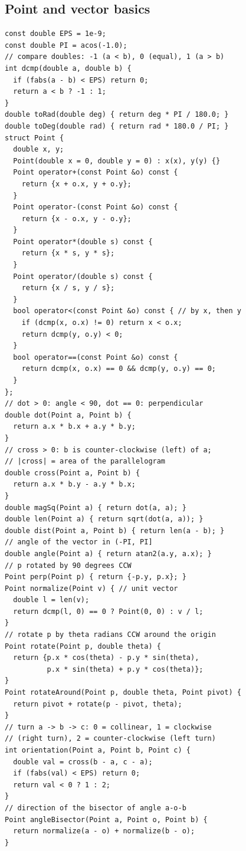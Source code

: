 \documentclass[8pt, a4paper]{article}
\begin{document}
\begin{multicols*}{3}
\subsection{Point and vector basics}
\begin{lstlisting}
const double EPS = 1e-9;
const double PI = acos(-1.0);
// compare doubles: -1 (a < b), 0 (equal), 1 (a > b)
int dcmp(double a, double b) {
  if (fabs(a - b) < EPS) return 0;
  return a < b ? -1 : 1;
}
double toRad(double deg) { return deg * PI / 180.0; }
double toDeg(double rad) { return rad * 180.0 / PI; }
struct Point {
  double x, y;
  Point(double x = 0, double y = 0) : x(x), y(y) {}
  Point operator+(const Point &o) const {
    return {x + o.x, y + o.y};
  }
  Point operator-(const Point &o) const {
    return {x - o.x, y - o.y};
  }
  Point operator*(double s) const {
    return {x * s, y * s};
  }
  Point operator/(double s) const {
    return {x / s, y / s};
  }
  bool operator<(const Point &o) const { // by x, then y
    if (dcmp(x, o.x) != 0) return x < o.x;
    return dcmp(y, o.y) < 0;
  }
  bool operator==(const Point &o) const {
    return dcmp(x, o.x) == 0 && dcmp(y, o.y) == 0;
  }
};
// dot > 0: angle < 90, dot == 0: perpendicular
double dot(Point a, Point b) {
  return a.x * b.x + a.y * b.y;
}
// cross > 0: b is counter-clockwise (left) of a;
// |cross| = area of the parallelogram
double cross(Point a, Point b) {
  return a.x * b.y - a.y * b.x;
}
double magSq(Point a) { return dot(a, a); }
double len(Point a) { return sqrt(dot(a, a)); }
double dist(Point a, Point b) { return len(a - b); }
// angle of the vector in (-PI, PI]
double angle(Point a) { return atan2(a.y, a.x); }
// p rotated by 90 degrees CCW
Point perp(Point p) { return {-p.y, p.x}; }
Point normalize(Point v) { // unit vector
  double l = len(v);
  return dcmp(l, 0) == 0 ? Point(0, 0) : v / l;
}
// rotate p by theta radians CCW around the origin
Point rotate(Point p, double theta) {
  return {p.x * cos(theta) - p.y * sin(theta),
          p.x * sin(theta) + p.y * cos(theta)};
}
Point rotateAround(Point p, double theta, Point pivot) {
  return pivot + rotate(p - pivot, theta);
}
// turn a -> b -> c: 0 = collinear, 1 = clockwise
// (right turn), 2 = counter-clockwise (left turn)
int orientation(Point a, Point b, Point c) {
  double val = cross(b - a, c - a);
  if (fabs(val) < EPS) return 0;
  return val < 0 ? 1 : 2;
}
// direction of the bisector of angle a-o-b
Point angleBisector(Point a, Point o, Point b) {
  return normalize(a - o) + normalize(b - o);
}
\end{lstlisting}

\end{multicols*}
\end{document}
